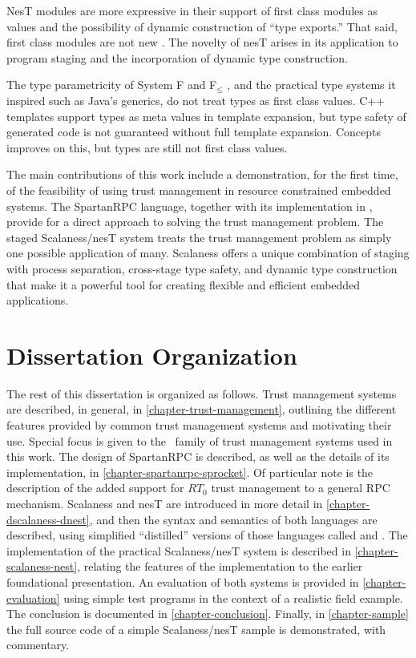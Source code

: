 NesT modules are more expressive in their support of first class modules as values and the
possibility of dynamic construction of ``type exports.'' That said, first class modules are not
new \cite{99620,ancona01calculus}. The novelty of nesT arises in its application to program
staging and the incorporation of dynamic type construction.

The type parametricity of System F and F$_\le$ \cite{Cardelli-1985}, and the practical type
systems it inspired such as Java's generics, do not treat types as first class values. C++
templates support types as meta values in template expansion, but type safety of generated code
is not guaranteed without full template expansion. Concepts \cite{gregor06:_concepts} improves
on this, but types are still not first class values.

The main contributions of this work include a demonstration, for the first time, of the
feasibility of using trust management in resource constrained embedded systems. The SpartanRPC
language, together with its implementation in \Sprocket, provide for a direct approach to
solving the trust management problem. The staged Scalaness/nesT system treats the trust
management problem as simply one possible application of many. Scalaness offers a unique
combination of staging with process separation, cross-stage type safety, and dynamic type
construction that make it a powerful tool for creating flexible and efficient embedded
applications.

\section{Dissertation Organization}

The rest of this dissertation is organized as follows. Trust management systems are described,
in general, in \autoref{chapter-trust-management}, outlining the different features provided by
common trust management systems and motivating their use. Special focus is given to the \RT\
family of trust management systems used in this work. The design of SpartanRPC is described, as
well as the details of its implementation, in \autoref{chapter-spartanrpc-sprocket}. Of
particular note is the description of the added support for $RT_0$ trust management to a general
RPC mechanism. Scalaness and nesT are introduced in more detail in
\autoref{chapter-dscalaness-dnest}, and then the syntax and semantics of both languages are
described, using simplified ``distilled'' versions of those languages called
\newterm{DScalaness} and \newterm{DnesT}. The implementation of the practical Scalaness/nesT
system is described in \autoref{chapter-scalaness-nest}, relating the features of the
implementation to the earlier foundational presentation. An evaluation of both systems is
provided in \autoref{chapter-evaluation} using simple test programs in the context of a
realistic field example. The conclusion is documented in \autoref{chapter-conclusion}. Finally,
in \autoref{chapter-sample} the full source code of a simple Scalaness/nesT sample is
demonstrated, with commentary.

